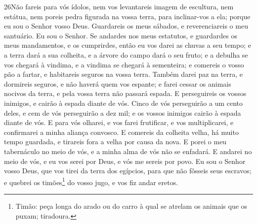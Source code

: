\lettrine{26} Não fareis para vós ídolos, nem vos levantareis
imagem de escultura, nem estátua, nem poreis pedra figurada na vossa
terra, para inclinar-vos a ela; porque eu sou o Senhor vosso Deus.
Guardareis os meus sábados, e reverenciareis o meu santuário. Eu
sou o Senhor. Se andardes nos meus estatutos, e guardardes os
meus mandamentos, e os cumprirdes, então eu vos darei as chuvas
a seu tempo; e a terra dará a sua colheita, e a árvore do campo dará
o seu fruto; e a debulha se vos chegará à vindima, e a vindima
se chegará à sementeira; e comereis o vosso pão a fartar, e
habitareis seguros na vossa terra. Também darei paz na terra, e
dormireis seguros, e não haverá quem vos espante; e farei cessar os
animais nocivos da terra, e pela vossa terra não passará espada.
E perseguireis os vossos inimigos, e cairão à espada diante de
vós. Cinco de vós perseguirão a um cento deles, e cem de vós
perseguirão a dez mil; e os vossos inimigos cairão à espada diante
de vós. E para vós olharei, e vos farei frutificar, e vos
multiplicarei, e confirmarei a minha aliança convosco. E
comereis da colheita velha, há muito tempo guardada, e tirareis fora
a velha por causa da nova. E porei o meu tabernáculo no meio
de vós, e a minha alma de vós não se enfadará. E andarei no
meio de vós, e eu vos serei por Deus, e vós me sereis por povo.
Eu sou o Senhor vosso Deus, que vos tirei da terra dos
egípcios, para que não fôsseis seus escravos; e quebrei os
timões\footnote{Timão: peça longa do arado ou do carro à qual se
atrelam os animais que os puxam; tiradoura.} do vosso jugo, e vos
fiz andar eretos.

